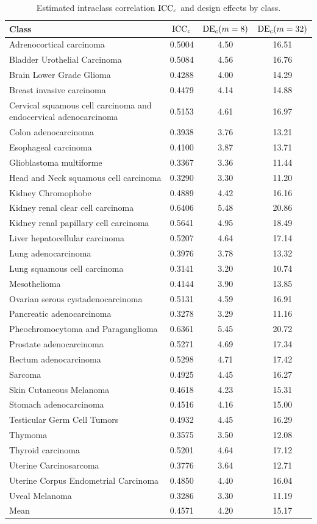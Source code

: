 \begin{table}[htbp]
\centering
\small
\begin{tabular}{lccc}
\toprule
Class & $\operatorname{ICC}_c$ & $\mathrm{DE}_c(m=8)$ & $\mathrm{DE}_c(m=32)$ \\
\midrule
Adrenocortical carcinoma & 0.5004 & 4.50 & 16.51 \\
Bladder Urothelial Carcinoma & 0.5084 & 4.56 & 16.76 \\
Brain Lower Grade Glioma & 0.4288 & 4.00 & 14.29 \\
Breast invasive carcinoma & 0.4479 & 4.14 & 14.88 \\
Cervical squamous cell carcinoma and endocervical adenocarcinoma & 0.5153 & 4.61 & 16.97 \\
Colon adenocarcinoma & 0.3938 & 3.76 & 13.21 \\
Esophageal carcinoma & 0.4100 & 3.87 & 13.71 \\
Glioblastoma multiforme & 0.3367 & 3.36 & 11.44 \\
Head and Neck squamous cell carcinoma & 0.3290 & 3.30 & 11.20 \\
Kidney Chromophobe & 0.4889 & 4.42 & 16.16 \\
Kidney renal clear cell carcinoma & 0.6406 & 5.48 & 20.86 \\
Kidney renal papillary cell carcinoma & 0.5641 & 4.95 & 18.49 \\
Liver hepatocellular carcinoma & 0.5207 & 4.64 & 17.14 \\
Lung adenocarcinoma & 0.3976 & 3.78 & 13.32 \\
Lung squamous cell carcinoma & 0.3141 & 3.20 & 10.74 \\
Mesothelioma & 0.4144 & 3.90 & 13.85 \\
Ovarian serous cystadenocarcinoma & 0.5131 & 4.59 & 16.91 \\
Pancreatic adenocarcinoma & 0.3278 & 3.29 & 11.16 \\
Pheochromocytoma and Paraganglioma & 0.6361 & 5.45 & 20.72 \\
Prostate adenocarcinoma & 0.5271 & 4.69 & 17.34 \\
Rectum adenocarcinoma & 0.5298 & 4.71 & 17.42 \\
Sarcoma & 0.4925 & 4.45 & 16.27 \\
Skin Cutaneous Melanoma & 0.4618 & 4.23 & 15.31 \\
Stomach adenocarcinoma & 0.4516 & 4.16 & 15.00 \\
Testicular Germ Cell Tumors & 0.4932 & 4.45 & 16.29 \\
Thymoma & 0.3575 & 3.50 & 12.08 \\
Thyroid carcinoma & 0.5201 & 4.64 & 17.12 \\
Uterine Carcinosarcoma & 0.3776 & 3.64 & 12.71 \\
Uterine Corpus Endometrial Carcinoma & 0.4850 & 4.40 & 16.04 \\
Uveal Melanoma & 0.3286 & 3.30 & 11.19 \\
\midrule
Mean & 0.4571 & 4.20 & 15.17 \\
\bottomrule
\end{tabular}
\caption{Estimated intraclass correlation $\operatorname{ICC}_c$ and design effects by class.}
\label{tab:breadth_class_iccs}
\end{table}
